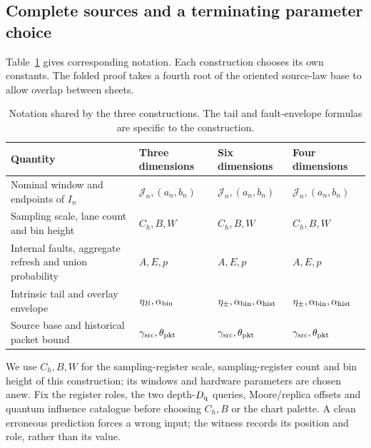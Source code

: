 \subsection{Complete sources and a terminating parameter choice}\label{v:parameters}

Table~\ref{tab:concordance} gives corresponding notation. Each construction chooses its own constants. The folded proof takes a fourth root of the oriented source-law base to allow overlap between sheets.

\begin{table}[tbp]
\centering\small
\caption{Notation shared by the three constructions. The tail and fault-envelope formulas are specific to the construction.}\label{tab:concordance}
\begin{tabular}{@{}>{\raggedright\arraybackslash}p{.36\linewidth}>{\raggedright\arraybackslash}p{.17\linewidth}>{\raggedright\arraybackslash}p{.17\linewidth}>{\raggedright\arraybackslash}p{.17\linewidth}@{}}
\toprule Quantity & Three dimensions & Six dimensions & Four dimensions\\\midrule
Nominal window and endpoints of \(I_n\) & \(\mathcal J_n,(a_n,b_n)\) & \(\mathcal J_n,(a_n,b_n)\) & \(\mathcal J_n,(a_n,b_n)\)\\\addlinespace[3pt]
Sampling scale, lane count and bin height & \(C_h,B,W\) & \(C_h,B,W\) & \(C_h,B,W\)\\\addlinespace[3pt]
Internal faults, aggregate refresh and union probability & \(A,E,p\) & \(A,E,p\) & \(A,E,p\)\\\addlinespace[3pt]
Intrinsic tail and overlay envelope & \(\eta_B,\alpha_{\rm bin}\) & \(\eta_\pm,\alpha_{\rm bin},\alpha_{\rm hist}\) & \(\eta_\pm,\alpha_{\rm bin},\alpha_{\rm hist}\)\\\addlinespace[3pt]
Source base and historical packet bound & \(\gamma_{\rm src},\theta_{\rm pkt}\) & \(\gamma_{\rm src},\theta_{\rm pkt}\) & \(\gamma_{\rm src},\theta_{\rm pkt}\)\\
\bottomrule
\end{tabular}
\end{table}

We use \(C_h,B,W\) for the sampling-register scale, sampling-register count and bin height of
this construction; its windows and hardware parameters are chosen
anew. Fix the register roles, the two depth-\(D_{\rm q}\) queries,
Moore/replica offsets and quantum influence catalogue before choosing
\(C_h,B\) or the chart palette.
A clean erroneous prediction forces a wrong input; the witness records
its position and role, rather than its value.

